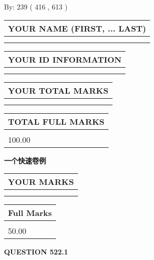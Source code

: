 \documentclass{ctexart}
\begin{document}
   
\hspace{1.0in} By: 
 239 ( 416 ,  613 )
   
   
   
   
\newpage 
\setcounter{page}{ 
   522001 } 
   
   
   
   
\noindent\begin{tabular}{|l|}
\hline
YOUR NAME (FIRST, ... LAST)  \\
\hline
 \\ 
 \\ 
\hline
\end{tabular}
\hspace{0.05in} \begin{tabular}{|l|}
\hline
 YOUR   ID   INFORMATION  \\
\hline
 \\ 
 \\ 
\hline
\end{tabular}
   
   
\vspace{0.2in}\noindent\begin{tabular}{|l|}
\hline
YOUR TOTAL MARKS  \\
\hline
 \\ 
 \\ 
\hline
\end{tabular}
\hspace{0.05in} \begin{tabular}{|l|}
\hline
TOTAL FULL MARKS  \\
\hline
 \\ 
100.00 \\
\hline
\end{tabular}
   
   
 \vspace{0.2in}
{\LARGE {\textbf{ 一个快速卷例}}}
   
   
  
\vspace{0.2in}
  
\noindent\begin{tabular}{|l|}
\hline
 YOUR MARKS  \\
\hline
 \\ 
 \\ 
\hline
\end{tabular}
\hspace{0.05in} \begin{tabular}{|l|}
\hline
 Full Marks  \\
\hline
 \\ 
50.00 \\
\hline
\end{tabular}
{\textbf{\Large{QUESTION
522.1 
}}}
  
\end{document}
